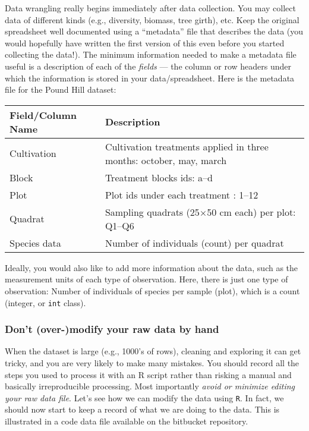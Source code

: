 Data wrangling really begins immediately after data collection. You may 
collect data of different kinds (e.g., diversity, biomass, tree girth), 
etc. Keep the original spreadsheet well documented using a ``metadata'' 
file that describes the data (you would hopefully have written the 
first version of this even before you started collecting the data!). 
The minimum information needed to make a metadata file useful is a 
description of each of the {\it fields} --- the column or row headers 
under which the information is stored in your data/spreadsheet. Here is 
the metadata file for the Pound Hill dataset:
\begin{center}
	\begin{tabular}{|p{3.5cm} | p{11cm}|}
		\hline
		{\bf Field/Column Name} & {\bf Description} \\ \hline
		Cultivation	& Cultivation treatments applied in three months: october, may, march \\ \hline
		Block &	Treatment blocks ids: a--d \\ \hline
		Plot &	Plot ids under each treatment : 1--12 \\ \hline
		Quadrat	& Sampling quadrats (25$\times$50 cm each) per plot: Q1--Q6 
		\\ \hline
		Species	data & Number of individuals (count) per quadrat \\ \hline
	\end{tabular}
\end{center}

Ideally, you would also like to add more information about the data, 
such as the measurement units of each type of observation. Here, there 
is just one type of observation: Number of individuals of species per 
sample (plot), which is a count (integer, or {\tt int} class). 

\subsubsection{Don't (over-)modify your raw data by hand}

When the dataset is large (e.g., 1000's of rows), cleaning and 
exploring it can get tricky, and you are very likely to make many 
mistakes. You should record all the steps you used to process it with 
an R script rather than risking a manual and basically irreproducible 
processing. Most importantly {\it avoid or minimize editing your raw 
data file}. Let's see how we can modify the data using {\tt R}. In 
fact, we should now start to keep a record of what we are doing to the 
data. This is illustrated in a code data file available on the 
bitbucket repository. 


